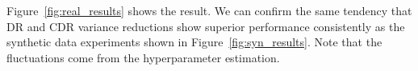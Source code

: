 

Figure~\ref{fig:real_results} shows the result.
%
We can confirm the same tendency that DR and CDR variance reductions show superior performance consistently as the synthetic data experiments shown in Figure~\ref{fig:syn_results}.
%
Note that the fluctuations come from the hyperparameter estimation.
%











